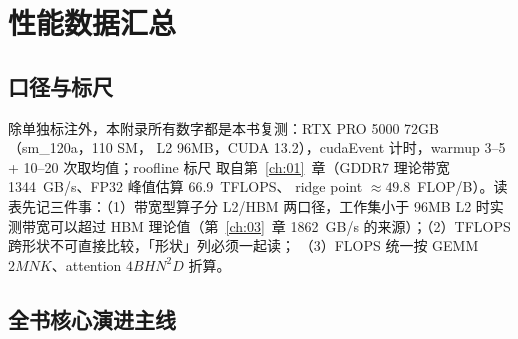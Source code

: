 \chapter{性能数据汇总}\label{app:B}

\section{口径与标尺}

除单独标注外，本附录所有数字都是本书复测：RTX PRO 5000 72GB（sm\_120a，110 SM，
L2 96MB，CUDA 13.2），cudaEvent 计时，warmup 3--5 + 10--20 次取均值；roofline 标尺
取自第~\ref{ch:01}~章（GDDR7 理论带宽 1344~GB/s、FP32 峰值估算 66.9~TFLOPS、
ridge point $\approx 49.8$~FLOP/B）。读表先记三件事：（1）带宽型算子分 L2/HBM
两口径，工作集小于 96MB L2 时实测带宽可以超过 HBM 理论值（第~\ref{ch:03}~章
1862~GB/s 的来源）；（2）TFLOPS 跨形状不可直接比较，「形状」列必须一起读；
（3）FLOPS 统一按 GEMM $2MNK$、attention $4BHN^2D$ 折算。

\section{全书核心演进主线}

